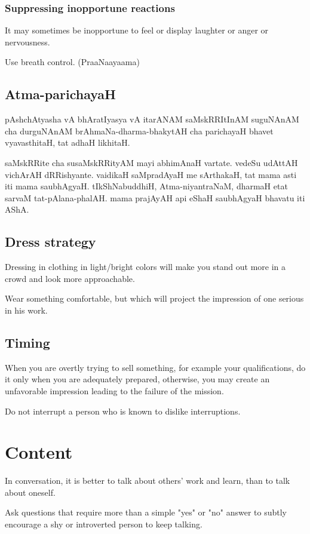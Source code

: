 \documentclass[oneside, article]{memoir}
\begin{document}
\subsection{Suppressing inopportune reactions}
It may sometimes be inopportune to feel or display laughter or anger or nervousness.

Use breath control. (PraaNaayaama)


\section{Atma-parichayaH}
pAshchAtyasha vA bhAratIyasya vA itarANAM saMskRRItInAM suguNAnAM cha durguNAnAM brAhmaNa-dharma-bhakytAH cha parichayaH bhavet vyavasthitaH, tat adhaH likhitaH.

saMskRRite cha susaMskRRityAM mayi abhimAnaH vartate. vedeSu udAttAH vichArAH dRRishyante. vaidikaH saMpradAyaH me sArthakaH, tat mama asti iti mama saubhAgyaH. tIkShNabuddhiH, Atma-niyantraNaM, dharmaH etat sarvaM tat-pAlana-phalAH. mama prajAyAH api eShaH saubhAgyaH bhavatu iti AShA.

\section{Dress strategy}
\subitem Dressing in clothing in light/bright colors will make you stand out more in a crowd and look more approachable.

\subitem Wear something comfortable, but which will project the impression of one serious in his work.

\section{Timing}
When you are overtly trying to sell something, for example your qualifications, do it only when you are adequately prepared, otherwise, you may create an unfavorable impression leading to the failure of the mission.

Do not interrupt a person who is known to dislike interruptions.


\chapter{Content}
In conversation, it is better to talk about others' work and learn, than to talk about oneself.

Ask questions that require more than a simple "yes" or "no" answer to subtly encourage a shy or introverted person to keep talking.
\end{document}
